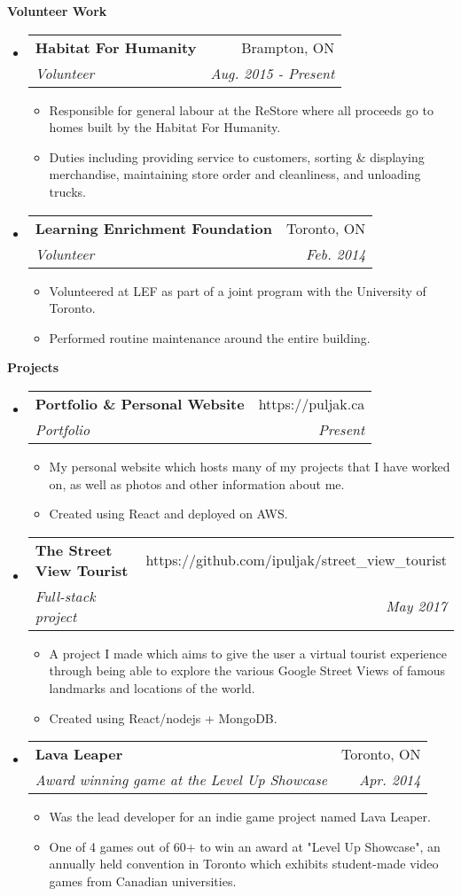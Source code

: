 \documentclass[letterpaper,11pt]{article}
\makeatletter
\newcommand{\resitem}[1]{\item #1 \vspace{-2pt}}
\newcommand{\ressubheading}[4]{
\begin{tabular*}{6.5in}{l@{\extracolsep{\fill}}r}
		\textbf{#1} & #2 \\
		\textit{#3} & \textit{#4} \\
\end{tabular*}\vspace{-6pt}}
\makeatother
\begin{document}
\begin{mdframed}[backgroundcolor=light-gray]
\textbf{Volunteer Work}
\end{mdframed}
\begin{itemize}
\item
	\ressubheading{Habitat For Humanity}{Brampton, ON}{Volunteer}{Aug. 2015 - Present}
	\begin{itemize}
		\resitem{Responsible for general labour at the ReStore where all proceeds go to homes built by the Habitat For Humanity.}
		\resitem{Duties including providing service to customers, sorting \& displaying merchandise, maintaining store order and cleanliness, and unloading trucks.}
	\end{itemize}
\item
	\ressubheading{Learning Enrichment Foundation}{Toronto, ON}{Volunteer}{Feb. 2014}
	\begin{itemize}
		\resitem{Volunteered at LEF as part of a joint program with the University of Toronto.}
		\resitem{Performed routine maintenance around the entire building.}
	\end{itemize}
\end{itemize}

\begin{mdframed}[backgroundcolor=light-gray]
\textbf{Projects}
\end{mdframed}
\begin{itemize}
\item
	\ressubheading{Portfolio \& Personal Website}{https://puljak.ca}{Portfolio}{Present}
	\begin{itemize}
		\resitem{My personal website which hosts many of my projects that I have worked on, as well as photos and other information about me.}
		\resitem{Created using React and deployed on AWS.}
	\end{itemize}
\item
	\ressubheading{The Street View Tourist}{https://github.com/ipuljak/street\_view\_tourist}{Full-stack project}{May 2017}
	\begin{itemize}
		\resitem{A project I made which aims to give the user a virtual tourist experience through being able to explore the various Google Street Views of famous landmarks and locations of the world.}
		\resitem{Created using React/nodejs + MongoDB.}
	\end{itemize}
\item
	\ressubheading{Lava Leaper}{Toronto, ON}{Award winning game at the Level Up Showcase}{Apr. 2014}
	\begin{itemize}
		\resitem{Was the lead developer for an indie game project named Lava Leaper.}
		\resitem{One of 4 games out of 60+ to win an award at "Level Up Showcase", an annually held convention in Toronto which exhibits student-made video games from Canadian universities.}
	\end{itemize}
\end{itemize}
\end{document}
